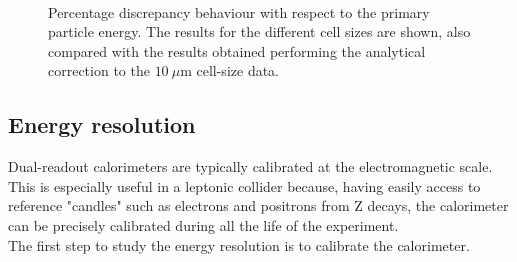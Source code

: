 \begin{figure}
	\centering
	 \\
	\caption{Percentage discrepancy behaviour with respect to the primary particle energy. The results for the different cell sizes are shown, also compared with the results obtained performing the analytical correction to the $10~\mu$m cell-size data.}
	\label{fig:sat_vs_E}
\end{figure}

\subsection{Energy resolution} \label{subsec:E_res}
Dual-readout calorimeters are typically calibrated at the electromagnetic scale. This is especially useful in a leptonic collider because, having easily access to reference "candles" such as  electrons and positrons from Z decays, the calorimeter can be precisely calibrated during all the life of the experiment.\\
The first step to study the energy resolution is to calibrate the calorimeter.\\

